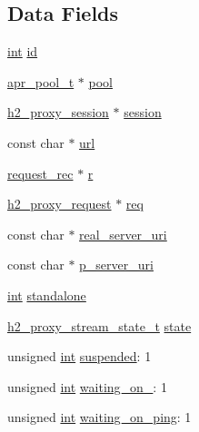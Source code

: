 \subsection*{Data Fields}
\begin{DoxyCompactItemize}
\item 
\hyperlink{pcre_8txt_a42dfa4ff673c82d8efe7144098fbc198}{int} \hyperlink{structh2__proxy__stream_af604b9138112d7ffaebd621833d0bf79}{id}
\item 
\hyperlink{structapr__pool__t}{apr\+\_\+pool\+\_\+t} $\ast$ \hyperlink{structh2__proxy__stream_a78e5316603c62639eb9b8bf7f08bac78}{pool}
\item 
\hyperlink{structh2__proxy__session}{h2\+\_\+proxy\+\_\+session} $\ast$ \hyperlink{structh2__proxy__stream_a2d437ab696e4b906b5054e77fec7de64}{session}
\item 
const char $\ast$ \hyperlink{structh2__proxy__stream_a75d286e1b30597458b7ab7cdbb99b96e}{url}
\item 
\hyperlink{structrequest__rec}{request\+\_\+rec} $\ast$ \hyperlink{structh2__proxy__stream_a6d01da8d12d432698f1d69d2d8f41676}{r}
\item 
\hyperlink{structh2__proxy__request}{h2\+\_\+proxy\+\_\+request} $\ast$ \hyperlink{structh2__proxy__stream_a78b0ecb98be9f725ddd970561f4eecd5}{req}
\item 
const char $\ast$ \hyperlink{structh2__proxy__stream_a573a95001d1622ab515ecb838be9f8c7}{real\+\_\+server\+\_\+uri}
\item 
const char $\ast$ \hyperlink{structh2__proxy__stream_aef76d96b18ed9270e0a3b50f4b2cf2a2}{p\+\_\+server\+\_\+uri}
\item 
\hyperlink{pcre_8txt_a42dfa4ff673c82d8efe7144098fbc198}{int} \hyperlink{structh2__proxy__stream_a28b67033df448ef1ea938e4c0c536999}{standalone}
\item 
\hyperlink{h2__proxy__session_8h_a302ceae7ead80c7b6d60b947b11d2793}{h2\+\_\+proxy\+\_\+stream\+\_\+state\+\_\+t} \hyperlink{structh2__proxy__stream_a58ef73649919ec9e353f6ed49154714d}{state}
\item 
unsigned \hyperlink{pcre_8txt_a42dfa4ff673c82d8efe7144098fbc198}{int} \hyperlink{structh2__proxy__stream_a1fb96687acef9c871801f7a51e1e241e}{suspended}\+: 1
\item 
unsigned \hyperlink{pcre_8txt_a42dfa4ff673c82d8efe7144098fbc198}{int} \hyperlink{structh2__proxy__stream_acfc9ba07bf510195bdb0dc4b4f6faebd}{waiting\+\_\+on\+\_}\+: 1
\item 
unsigned \hyperlink{pcre_8txt_a42dfa4ff673c82d8efe7144098fbc198}{int} \hyperlink{structh2__proxy__stream_ac969a6ac3e74dcae2f4395518dedb19f}{waiting\+\_\+on\+\_\+ping}\+: 1

\end{DoxyCompactItemize}
